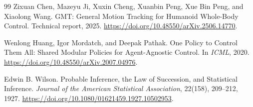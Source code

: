 \begin{thebibliography}{99}
Zixuan Chen, Mazeyu Ji, Xuxin Cheng, Xuanbin Peng, Xue Bin Peng,
and Xiaolong Wang.
GMT: General Motion Tracking for Humanoid Whole-Body Control.
Technical report, 2025.
\url{https://doi.org/10.48550/arXiv.2506.14770}.

Wenlong Huang, Igor Mordatch, and Deepak Pathak.
One Policy to Control Them All: Shared Modular Policies for
Agent-Agnostic Control.
In \emph{ICML}, 2020.
\url{https://doi.org/10.48550/arXiv.2007.04976}.

Edwin B. Wilson.
Probable Inference, the Law of Succession, and Statistical Inference.
\emph{Journal of the American Statistical Association}, 22(158), 209--212, 1927.
\url{https://doi.org/10.1080/01621459.1927.10502953}.

\end{thebibliography}
